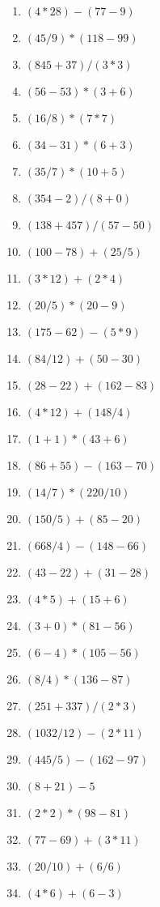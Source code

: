 \documentclass{article}%
\begin{document}
%
\normalsize%
\begin{multicols}{2}%
\begin{enumerate}%
\item%
$(4*28){-}(77{-}9)$%
\item%
$(45/9)*(118{-}99)$%
\item%
$(845+37)/(3*3)$%
\item%
$(56{-}53)*(3+6)$%
\item%
$(16/8)*(7*7)$%
\item%
$(34{-}31)*(6+3)$%
\item%
$(35/7)*(10+5)$%
\item%
$(354{-}2)/(8+0)$%
\item%
$(138+457)/(57{-}50)$%
\item%
$(100{-}78)+(25/5)$%
\item%
$(3*12)+(2*4)$%
\item%
$(20/5)*(20{-}9)$%
\item%
$(175{-}62){-}(5*9)$%
\item%
$(84/12)+(50{-}30)$%
\item%
$(28{-}22)+(162{-}83)$%
\item%
$(4*12)+(148/4)$%
\item%
$(1+1)*(43+6)$%
\item%
$(86+55){-}(163{-}70)$%
\item%
$(14/7)*(220/10)$%
\item%
$(150/5)+(85{-}20)$%
\item%
$(668/4){-}(148{-}66)$%
\item%
$(43{-}22)+(31{-}28)$%
\item%
$(4*5)+(15+6)$%
\item%
$(3+0)*(81{-}56)$%
\item%
$(6{-}4)*(105{-}56)$%
\item%
$(8/4)*(136{-}87)$%
\item%
$(251+337)/(2*3)$%
\item%
$(1032/12){-}(2*11)$%
\item%
$(445/5){-}(162{-}97)$%
\item%
$(8+21){-}5$%
\item%
$(2*2)*(98{-}81)$%
\item%
$(77{-}69)+(3*11)$%
\item%
$(20/10)+(6/6)$%
\item%
$(4*6)+(6{-}3)$%
\end{enumerate}%
\end{multicols}%
\vspace*{1cm}%
\end{document}
